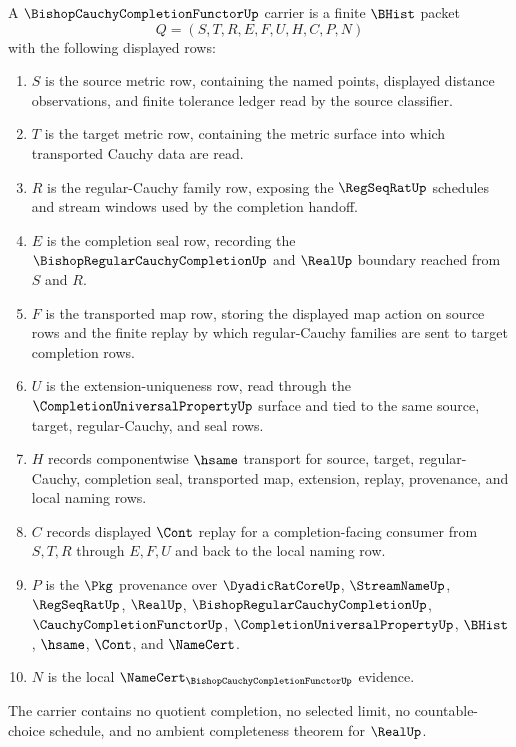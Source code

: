 \begin{definition}
\label{def:bishop-cauchy-completion-functor-carrier}
A $\BishopCauchyCompletionFunctorUp$ carrier is a finite $\BHist$ packet
$$
Q=(S,T,R,E,F,U,H,C,P,N)
$$
with the following displayed rows:
\begin{enumerate}
\item $S$ is the source metric row, containing the named points, displayed distance observations, and finite tolerance ledger read by the source classifier.
\item $T$ is the target metric row, containing the metric surface into which transported Cauchy data are read.
\item $R$ is the regular-Cauchy family row, exposing the $\RegSeqRatUp$ schedules and stream windows used by the completion handoff.
\item $E$ is the completion seal row, recording the $\BishopRegularCauchyCompletionUp$ and $\RealUp$ boundary reached from $S$ and $R$.
\item $F$ is the transported map row, storing the displayed map action on source rows and the finite replay by which regular-Cauchy families are sent to target completion rows.
\item $U$ is the extension-uniqueness row, read through the $\CompletionUniversalPropertyUp$ surface and tied to the same source, target, regular-Cauchy, and seal rows.
\item $H$ records componentwise $\hsame$ transport for source, target, regular-Cauchy, completion seal, transported map, extension, replay, provenance, and local naming rows.
\item $C$ records displayed $\Cont$ replay for a completion-facing consumer from $S,T,R$ through $E,F,U$ and back to the local naming row.
\item $P$ is the $\Pkg$ provenance over $\DyadicRatCoreUp$, $\StreamNameUp$, $\RegSeqRatUp$, $\RealUp$, $\BishopRegularCauchyCompletionUp$, $\CauchyCompletionFunctorUp$, $\CompletionUniversalPropertyUp$, $\BHist$, $\hsame$, $\Cont$, and $\NameCert$.
\item $N$ is the local $\NameCert_{\BishopCauchyCompletionFunctorUp}$ evidence.
\end{enumerate}
The carrier contains no quotient completion, no selected limit, no countable-choice schedule, and no ambient completeness theorem for $\RealUp$.
\end{definition}

